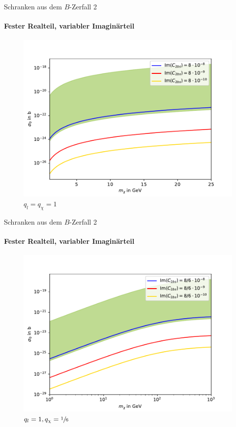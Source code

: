 \begin{frame}{Schranken aus dem $B$-Zerfall 2}
\framesubtitle{Fester Realteil, variabler Imaginärteil}
	\begin{figure}
		\centering
		\includegraphics[width=.8\textwidth]{Bilder/Im11.pdf}
		\caption{$q_l=q_\chi=1$}
	\end{figure}
\end{frame}
\begin{frame}[noframenumbering]{Schranken aus dem $B$-Zerfall 2}
\framesubtitle{Fester Realteil, variabler Imaginärteil}
	\begin{figure}
		\centering
		\includegraphics[width=.8\textwidth]{Bilder/Im116.pdf}
		\caption{$q_l=1,q_\chi=\sfrac{1}{6}$}
	\end{figure}
\end{frame}


